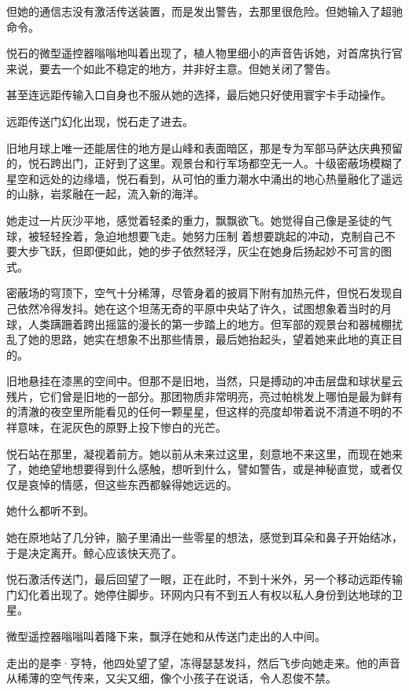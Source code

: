\documentclass[AutoFakeBold=true]{book}
\begin{document}
但她的通信志没有激活传送装置，而是发出警告，去那里很危险。但她输入了超驰命令。

悦石的微型遥控器嗡嗡地叫着出现了，植人物里细小的声音告诉她，对首席执行官来说，要去一个如此不稳定的地方，并非好主意。但她关闭了警告。

甚至连远距传输入口自身也不服从她的选择，最后她只好使用寰宇卡手动操作。

远距传送门幻化出现，悦石走了进去。

\vspace*{1em}

旧地月球上唯一还能居住的地方是山峰和表面暗区，那是专为军部马萨达庆典预留的，悦石跨出门，正好到了这里。观景台和行军场都空无一人。十级密蔽场模糊了星空和远处的边缘墙，悦石看到，从可怕的重力潮水中涌出的地心热量融化了遥远的山脉，岩浆融在一起，流入新的海洋。

她走过一片灰沙平地，感觉着轻柔的重力，飘飘欲飞。她觉得自己像是圣徒的气球，被轻轻拴着，急迫地想要飞走。她努力压制 着想要跳起的冲动，克制自己不要大步飞跃，但即便如此，她的步子依然轻浮，灰尘在她身后扬起妙不可言的图式。

密蔽场的穹顶下，空气十分稀薄，尽管身着的披肩下附有加热元件，但悦石发现自己依然冷得发抖。她在这个坦荡无奇的平原中央站了许久，试图想象着当时的月球，人类蹒跚着跨出摇篮的漫长的第一步踏上的地方。但军部的观景台和器械棚扰乱了她的思路，她实在想象不出那些情景，最后她抬起头，望着她来此地的真正目的。

旧地悬挂在漆黑的空间中。但那不是旧地，当然，只是搏动的冲击层盘和球状星云残片，它们曾是旧地的一部分。那团物质非常明亮，亮过帕桃发上哪怕是最为鲜有的清澈的夜空里所能看见的任何一颗星星，但这样的亮度却带着说不清道不明的不祥意味，在泥灰色的原野上投下惨白的光芒。

悦石站在那里，凝视着前方。她以前从未来过这里，刻意地不来这里，而现在她来了，她绝望地想要得到什么{\kaishu 感触}，想听到什么，譬如警告，或是神秘直觉，或者仅仅是哀悼的情感，但这些东西都躲得她远远的。

她什么都听不到。

她在原地站了几分钟，脑子里涌出一些零星的想法，感觉到耳朵和鼻子开始结冰，于是决定离开。鲸心应该快天亮了。

悦石激活传送门，最后回望了一眼，正在此时，不到十米外，另一个移动远距传输门幻化着出现了。她停住脚步。环网内只有不到五人有权以私人身份到达地球的卫星。

微型遥控器嗡嗡叫着降下来，飘浮在她和从传送门走出的人中间。

走出的是李·亨特，他四处望了望，冻得瑟瑟发抖，然后飞步向她走来。他的声音从稀薄的空气传来，又尖又细，像个小孩子在说话，令人忍俊不禁。
\end{document}
